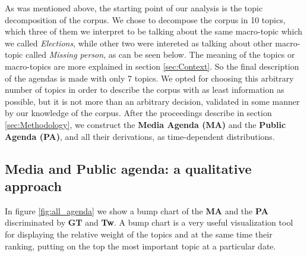 
\par As was mentioned above, the starting point of our analysis is the topic decomposition of the corpus.
We chose to decompose the corpus in 10 topics, which three of them we interpret to be talking about the same macro-topic which we called \emph{Elections}, while other two were intereted as talking about other macro-topic called \emph{Missing person}, as can be seen below. 
The meaning of the topics or macro-topics are more explained in section \ref{sec:Context}. 
So the final description of the agendas is made with only 7 topics.
We opted for choosing this arbitrary number of topics in order to describe the corpus with as least information as possible, but it is not more than an arbitrary decision, validated in some manner by our knowledge of the corpus.
After the proceedings describe in section \ref{sec:Methodology}, we construct the \textbf{Media Agenda (MA)} and the \textbf{Public Agenda (PA)}, and all their derivations, as time-dependent distributions. 

\subsection{Media and Public agenda: a qualitative approach}

\par In figure \ref{fig:all_agenda} we show a bump chart of the \textbf{MA} and the \textbf{PA} discriminated by \textbf{GT} and \textbf{Tw}. 
A bump chart is a very useful visualization tool for displaying the relative weight of the topics and at the same time their ranking, putting on the top the most important topic at a particular date.

